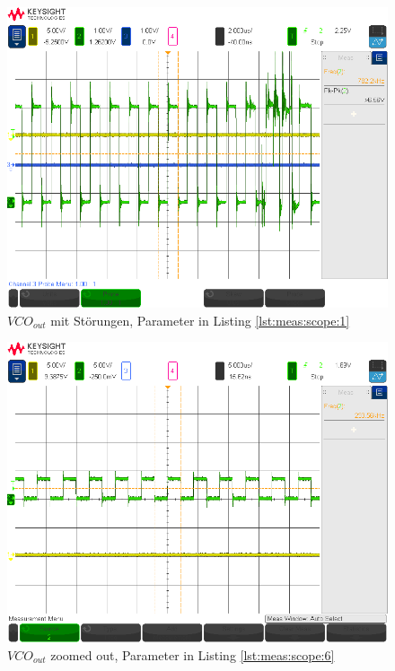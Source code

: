 \begin{figure}[h!tb]
    \centering
    \includegraphics[width=1\textwidth, trim=0mm 21mm 0mm 11mm, clip]{images/scopeShots/scope_1b.png}
    \caption{$VCO_{out}$ mit Störungen, Parameter in Listing \ref{lst:meas:scope:1}}
    \label{fig:meas:scope:1}
\end{figure}

\begin{figure}[h!tb]
    \centering
    \includegraphics[width=1\textwidth, trim=0mm 21mm 0mm 11mm, clip]{images/scopeShots/scope_6b.png}
    \caption{$VCO_{out}$ zoomed out, Parameter in Listing \ref{lst:meas:scope:6}}
    \label{fig:meas:scope:6}
\end{figure}


